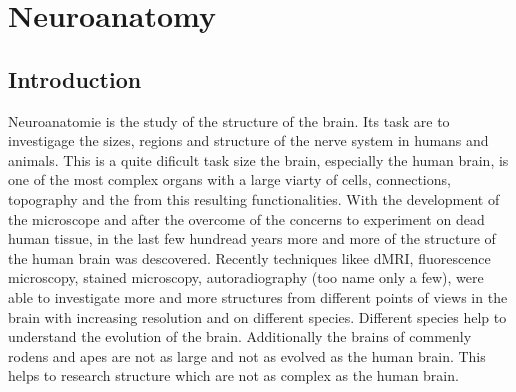 \setcounter{chapter}{1}
\chapter{Neuroanatomy}
\label{sec:neuro}
%
%
\section{Introduction}
% 
Neuroanatomie is the study of the structure of the brain.
Its task are to investigage the sizes, regions and structure of the nerve system in humans and animals.
This is a quite dificult task size the brain, especially the human brain, is one of the most complex organs with a large viarty of cells, connections, topography and the from this resulting functionalities.
With the development of the microscope and after the overcome of the concerns to experiment on dead human tissue, in the last few hundread years more and more of the structure of the human brain was descovered.
Recently techniques likee \acs{dMRI}, fluorescence microscopy, stained microscopy, autoradiography (too name only a few), were able to investigate more and more structures from different points of views in the brain with increasing resolution and on different species.
Different species help to understand the evolution of the brain. Additionally the brains of commenly rodens and apes are not as large and not as evolved as the human brain.
This helps to research structure which are not as complex as the human brain.
%
% 
% 
